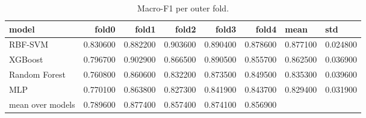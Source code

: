 \begin{table}
\caption{Macro-F1 per outer fold.}
\label{tab:s1_folds}
\begin{tabular}{lrrrrrll}
\toprule
model & fold0 & fold1 & fold2 & fold3 & fold4 & mean & std \\
\midrule
RBF-SVM & 0.830600 & 0.882200 & 0.903600 & 0.890400 & 0.878600 & 0.877100 & 0.024800 \\
XGBoost & 0.796700 & 0.902900 & 0.866500 & 0.890500 & 0.855700 & 0.862500 & 0.036900 \\
Random Forest & 0.760800 & 0.860600 & 0.832200 & 0.873500 & 0.849500 & 0.835300 & 0.039600 \\
MLP & 0.770100 & 0.863800 & 0.827300 & 0.841900 & 0.843700 & 0.829400 & 0.031900 \\
mean over models & 0.789600 & 0.877400 & 0.857400 & 0.874100 & 0.856900 &  &  \\
\bottomrule
\end{tabular}
\end{table}
